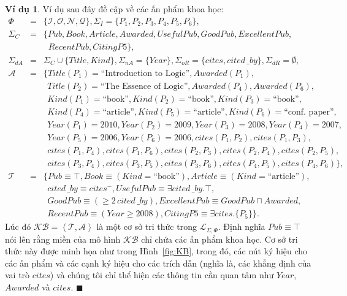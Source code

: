 \documentclass[12pt,a4paper,twoside]{report}
\newcommand{\mL}		{\mathcal{L}}
\newcommand{\mA}		{\mathcal{A}}
\newcommand{\mT}		{\mathcal{T}}
\newcommand{\mI}		{\mathcal{I}}
\newcommand{\mO}		{\mathcal{O}}
\newcommand{\mN}		{\mathcal{N}}
\newcommand{\mQ}		{\mathcal{Q}}
\newcommand{\SigmaI}	{\Sigma_I}
\newcommand{\SigmaC}	{\Sigma_C}
\newcommand{\SigmaDA}	{\Sigma_{dA}}
\newcommand{\SigmaNA}	{\Sigma_{nA}}
\newcommand{\SigmaOR}	{\Sigma_{oR}}
\newcommand{\SigmaDR}	{\Sigma_{dR}}
\newcommand{\KB}		{\mathcal{KB}}
\newcommand{\mLSP}		{\mL_{\Sigma,\Phi}}
\newcommand{\myend}		{\mbox{}\hfill\mbox{{\scriptsize$\!\blacksquare$}}}
\newcommand{\tuple}[1]	{\left\langle#1\right\rangle\!}
\newcommand{\mand}		{\sqcap}
\newcommand{\E}			{\exists}
\newcommand{\Publication}	{\mathit{Pub}}
\newcommand{\Pub}			{\mathit{P}}
\newcommand{\Book}			{\mathit{Book}}
\newcommand{\Article}		{\mathit{Article}}
\newcommand{\Kind}			{\mathit{Kind}}
\newcommand{\Awarded}		{\mathit{Awarded}}
\newcommand{\PubName}		{\mathit{Title}}
\newcommand{\PubYear}		{\mathit{Year}}
\newcommand{\Cites}			{\mathit{cites}}
\newcommand{\Citedby}		{\mathit{cited\!\,\_by}}
\newcommand{\UsefulPub}		{\mathit{UsefulPub}}
\newcommand{\GoodPub}		{\mathit{GoodPub}}
\newcommand{\ExcellentPub}	{\mathit{ExcellentPub}}
\newcommand{\RecentPub}		{\mathit{RecentPub}}
\newcommand{\CitingP}		{\mathit{CitingP}}
\newcommand{\textItL}		{\textrm{``Introduction to Logic''}}
\newcommand{\textTEoL}		{\textrm{``The Essence of Logic''}}
\newcommand{\textB}			{\textrm{``book''}}
\newcommand{\textA}			{\textrm{``article''}}
\newcommand{\textC}			{\textrm{``conf.~paper''}}
\theoremstyle{definition}
\newtheorem{Example}{Ví dụ}[chapter]
\begin{document}
\begin{Example} \label{exam:KB}
Ví dụ sau đây đề cập về các ấn phẩm khoa học:
\begin{eqnarray*}
\Phi & = & \{\mI,\mO,\mN,\mQ\}, \SigmaI = \{\Pub_1, \Pub_2, \Pub_3, \Pub_4, \Pub_5, \Pub_6\}, \\
\SigmaC & = & \{\Publication, \Book, \Article, \Awarded, \UsefulPub, \GoodPub, \ExcellentPub,\\
& & \;\; \RecentPub, \CitingP5 \}, \\
\SigmaDA & = & \SigmaC \cup \{\PubName, \Kind\}, \SigmaNA = \{\PubYear\}, \SigmaOR = \{\Cites, \Citedby\}, \SigmaDR = \emptyset, \\
\mA & = & \{\PubName(\Pub_1) = \textItL, \Awarded(\Pub_1),\\
& & \;\, \PubName(\Pub_2) = \textTEoL,  \Awarded(\Pub_4), \Awarded(\Pub_6), \\
& & \;\, \Kind(\Pub_1) = \textB, \Kind(\Pub_2) = \textB, \Kind(\Pub_3) = \textB,  \\
& & \;\,\Kind(\Pub_4)\!=\!\textA, \Kind(\Pub_5)\!=\!\textA, \Kind(\Pub_6)\!=\! \textC, \\
& & \;\, \PubYear(\Pub_1)\!=\!2010, \PubYear(\Pub_2)\!=\!2009,  \PubYear(\Pub_3)\!=\!2008, \PubYear(\Pub_4)\! =\! 2007, \\
& & \;\, \PubYear(\Pub_5) = 2006, \PubYear(\Pub_6) = 2006,  \Cites(\Pub_1, \Pub_2), \Cites(\Pub_1, \Pub_3), \\
& & \;\,\Cites(\Pub_1, \Pub_4), \Cites(\Pub_1, \Pub_6), \Cites(\Pub_2, \Pub_3), \Cites(\Pub_2, \Pub_4), \Cites(\Pub_2, \Pub_5), \\
& & \;\,\Cites(\Pub_3, \Pub_4), \Cites(\Pub_3, \Pub_5), \Cites(\Pub_3, \Pub_6), \Cites(\Pub_4, \Pub_5), \Cites(\Pub_4, \Pub_6)\}, \\
\mT & = & \{Pub \equiv \top, \Book \equiv (\Kind = \textB), \Article \equiv (\Kind = \textA), \\
& & \;\, \Citedby \equiv \Cites^-, \UsefulPub \equiv \E\Citedby.\top, \\
& & \;\, \GoodPub \equiv (\geq 2\,\Citedby), \ExcellentPub \equiv \GoodPub \mand \Awarded, \\
& & \;\, \RecentPub \equiv (\PubYear \geq 2008), \CitingP5 \equiv \E\Cites.\{\Pub_5\} \}.
\end{eqnarray*}
Lúc đó $\KB = \tuple{\mT,\mA}$ là một cơ sở tri thức trong $\mLSP$. Định nghĩa \mbox{$\Publication \equiv \top$} nói lên rằng miền của mô hình $\KB$ chỉ chứa các ấn phẩm khoa học. Cơ sở tri thức này được minh họa như trong Hình~\ref{fig:KB}, trong đó, các nút ký hiệu cho các ấn phẩm và các cạnh ký hiệu cho các trích dẫn (nghĩa là, các khẳng định của vai trò $\Cites$) và chúng tôi chỉ thể hiện các thông tin cần quan tâm như $\PubYear$, $\Awarded$ và $\Cites$.
\myend
\end{Example}
\end{document}
